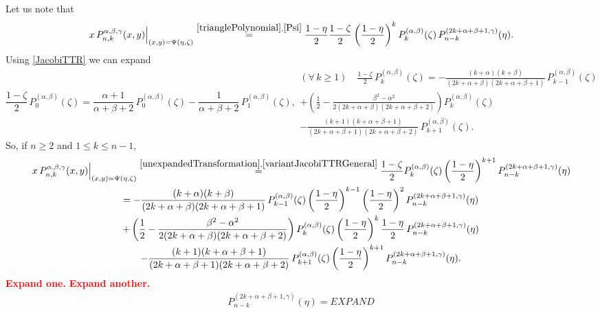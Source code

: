 \documentclass{article}
\numberwithin{equation}{section}
\numberwithin{figure}{section}
\begin{document}
Let us note that
%
\begin{equation}\label{unexpandedTransformation}
\left. x \, P^{\alpha,\beta,\gamma}_{n,k}(x,y) \right|_{(x,y) = \Psi(\eta,\zeta)}
\stackrel{\eqref{trianglePolynomial},\eqref{Psi}}{=} \frac{1-\eta}{2} \frac{1-\zeta}{2} \left(\frac{1-\eta}{2}\right)^k P^{(\alpha,\beta)}_k(\zeta) \, P^{(2k+\alpha+\beta+1,\gamma)}_{n-k}(\eta).
\end{equation}
%
Using \eqref{JacobiTTR} we can expand
%
\begin{subequations}
\begin{equation}\label{variantJacobiTTRFirst}
\frac{1-\zeta}{2} \, P^{(\alpha,\beta)}_0(\zeta) = \frac{\alpha+1}{\alpha+\beta+2} \, P^{(\alpha,\beta)}_0(\zeta) - \frac{1}{\alpha+\beta+2} \, P^{(\alpha,\beta)}_1(\zeta),
\end{equation}
\begin{multline}\label{variantJacobiTTRGeneral}
(\forall\,k\geq 1) \quad \frac{1-\zeta}{2} \, P^{(\alpha,\beta)}_k(\zeta)
= -\frac{(k+\alpha)(k+\beta)}{(2k+\alpha+\beta)(2k+\alpha+\beta+1)} \, P^{(\alpha,\beta)}_{k-1}(\zeta)\\
+ \left( \frac{1}{2} - \frac{\beta^2-\alpha^2}{2(2k+\alpha+\beta)(2k+\alpha+\beta+2)} \right) P^{(\alpha,\beta)}_k(\zeta)\\
- \frac{(k+1)(k+\alpha+\beta+1)}{(2k+\alpha+\beta+1)(2k+\alpha+\beta+2)} \, P^{(\alpha,\beta)}_{k+1}(\zeta).
\end{multline}
\end{subequations}
%
So, if $n \geq 2$ and $1 \leq k \leq n-1$,
%
\begin{multline*}
\left. x \, P^{\alpha,\beta,\gamma}_{n,k}(x,y) \right|_{(x,y) = \Psi(\eta,\zeta)}
\stackrel{\eqref{unexpandedTransformation},\eqref{variantJacobiTTRGeneral}}{=} \frac{1-\zeta}{2} P^{(\alpha,\beta)}_k(\zeta) \left(\frac{1-\eta}{2}\right)^{k+1} P^{(2k+\alpha+\beta+1,\gamma)}_{n-k}(\eta)\\
= -\frac{(k+\alpha)(k+\beta)}{(2k+\alpha+\beta)(2k+\alpha+\beta+1)} \, P^{(\alpha,\beta)}_{k-1}(\zeta) \left(\frac{1-\eta}{2}\right)^{k-1} \left(\frac{1-\eta}{2}\right)^2 P^{(2k+\alpha+\beta+1,\gamma)}_{n-k}(\eta)\\
+ \left( \frac{1}{2} - \frac{\beta^2-\alpha^2}{2(2k+\alpha+\beta)(2k+\alpha+\beta+2)} \right) P^{(\alpha,\beta)}_k(\zeta) \left(\frac{1-\eta}{2}\right)^k \frac{1-\eta}{2} \, P^{(2k+\alpha+\beta+1,\gamma)}_{n-k}(\eta)\\
- \frac{(k+1)(k+\alpha+\beta+1)}{(2k+\alpha+\beta+1)(2k+\alpha+\beta+2)} \, P^{(\alpha,\beta)}_{k+1}(\zeta) \left(\frac{1-\eta}{2}\right)^{k+1} P^{(2k+\alpha+\beta+1,\gamma)}_{n-k}(\eta).
\end{multline*}
%
\textcolor{red}{\textbf{Expand one.}}
\textcolor{red}{\textbf{Expand another.}}
%
\begin{multline*}
P^{(2k+\alpha+\beta+1,\gamma)}_{n-k}(\eta) = EXPAND
\end{multline*}
%
\end{document}
